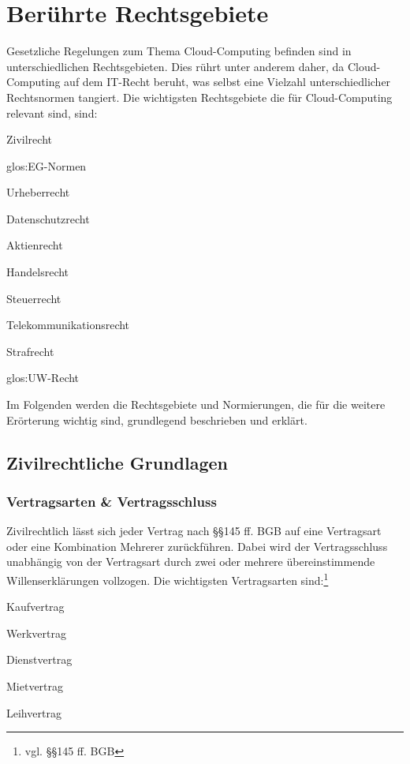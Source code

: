 \chapter{Ber\"uhrte Rechtsgebiete}
Gesetzliche Regelungen zum Thema Cloud-Computing befinden sind in unterschiedlichen Rechtsgebieten. Dies r\"uhrt unter anderem daher, da Cloud-Computing auf dem IT-Recht beruht, was selbst eine Vielzahl unterschiedlicher Rechtsnormen tangiert.
Die wichtigsten Rechtsgebiete die f\"ur Cloud-Computing relevant sind, sind:
 \begin{seList}      
\item Zivilrecht
\item  \gls{glos:EG}-Normen
\item Urheberrecht
\item Datenschutzrecht
\item Aktienrecht
\item Handelsrecht
\item Steuerrecht
\item Telekommunikationsrecht
\item Strafrecht
\item \gls{glos:UW}-Recht
 \end{seList}      
Im Folgenden werden die Rechtsgebiete und Normierungen, die f\"ur die weitere Er\"orterung wichtig sind, grundlegend beschrieben und erkl\"art.

\section{Zivilrechtliche Grundlagen}
\subsection{Vertragsarten \& Vertragsschluss}
Zivilrechtlich l\"asst sich jeder Vertrag nach §§145 ff. BGB auf eine Vertragsart oder eine Kombination Mehrerer zur\"uckf\"uhren. Dabei wird der Vertragsschluss unabh\"angig von der Vertragsart durch zwei oder mehrere \"ubereinstimmende Willenserkl\"arungen vollzogen. Die wichtigsten Vertragsarten sind:\footnote{vgl.  §§145 ff. BGB}
 \begin{seList}                            
\item Kaufvertrag 
\item Werkvertrag
\item Dienstvertrag
\item Mietvertrag
\item Leihvertrag
\end{seList} 
\label{vertragsarten_u_vertragsschluss}

